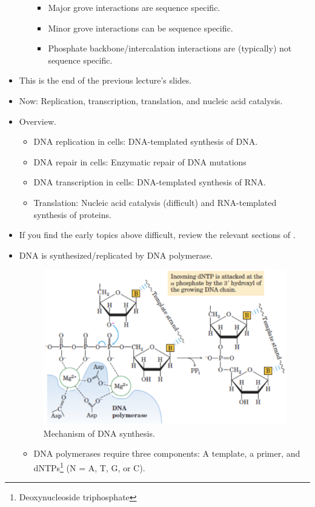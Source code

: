 \documentclass[../notes.tex]{subfiles}
\begin{document}
\begin{itemize}
\begin{itemize}
        \begin{itemize}
            \item Major grove interactions are sequence specific.
            \item Minor grove interactions can be sequence specific.
            \item Phosphate backbone/intercalation interactions are (typically) not sequence specific.
        \end{itemize}
    \end{itemize}
    \item This is the end of the previous lecture's slides.
    \item Now: Replication, transcription, translation, and nucleic acid catalysis.
    \item Overview.
    \begin{itemize}
        \item DNA replication in cells: DNA-templated synthesis of DNA.
        \item DNA repair in cells: Enzymatic repair of DNA mutations
        \item DNA transcription in cells: DNA-templated synthesis of RNA.
        \item Translation: Nucleic acid catalysis (difficult) and RNA-templated synthesis of proteins.
    \end{itemize}
    \item If you find the early topics above difficult, review the relevant sections of \textcite{bib:Lehninger}.
    \item DNA is synthesized/replicated by DNA polymerase.
    \begin{figure}[h!]
        \centering
        \includegraphics[width=0.6\linewidth]{../ExtFiles/DNASynMech.png}
        \caption{Mechanism of DNA synthesis.}
        \label{fig:DNASynMech}
    \end{figure}
    \begin{itemize}
        \item DNA polymerases require three components: A template, a primer, and dNTPs\footnote{Deoxynucleoside triphosphate} (N = A, T, G, or C).

\end{itemize}
\end{itemize}
\end{document}
